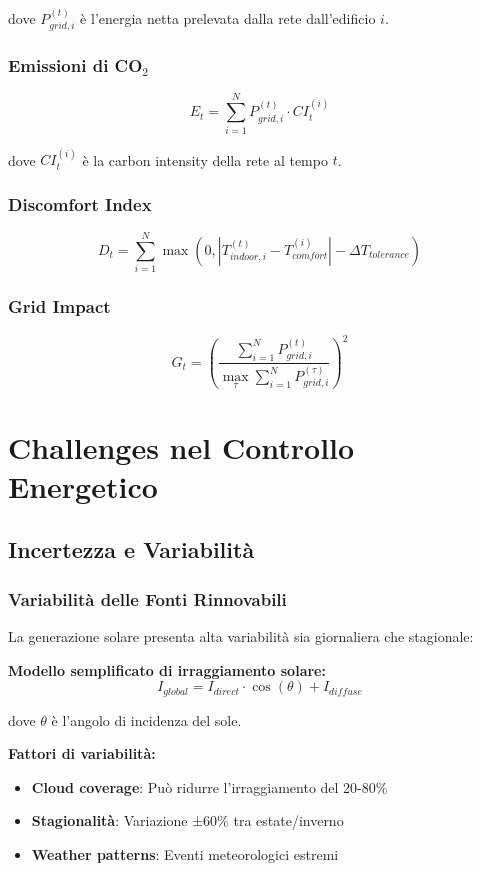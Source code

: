 \documentclass[12pt,a4paper,twoside]{report}
\begin{document}
dove $P_{grid,i}^{(t)}$ è l'energia netta prelevata dalla rete dall'edificio $i$.

\subsubsection{Emissioni di CO$_2$}
$$E_t = \sum_{i=1}^{N} P_{grid,i}^{(t)} \cdot CI_t^{(i)}$$

dove $CI_t^{(i)}$ è la carbon intensity della rete al tempo $t$.

\subsubsection{Discomfort Index}
$$D_t = \sum_{i=1}^{N} \max(0, |T_{indoor,i}^{(t)} - T_{comfort}^{(i)}| - \Delta T_{tolerance})$$

\subsubsection{Grid Impact}
$$G_t = \left(\frac{\sum_{i=1}^{N} P_{grid,i}^{(t)}}{\max_{\tau} \sum_{i=1}^{N} P_{grid,i}^{(\tau)}}\right)^2$$

\section{Challenges nel Controllo Energetico}

\subsection{Incertezza e Variabilità}

\subsubsection{Variabilità delle Fonti Rinnovabili}

La generazione solare presenta alta variabilità sia giornaliera che stagionale:

\textbf{Modello semplificato di irraggiamento solare:}
$$I_{global} = I_{direct} \cdot \cos(\theta) + I_{diffuse}$$

dove $\theta$ è l'angolo di incidenza del sole.

\textbf{Fattori di variabilità:}
\begin{itemize}
    \item \textbf{Cloud coverage}: Può ridurre l'irraggiamento del 20-80\%
    \item \textbf{Stagionalità}: Variazione ±60\% tra estate/inverno
    \item \textbf{Weather patterns}: Eventi meteorologici estremi
\end{itemize}
\end{document}
